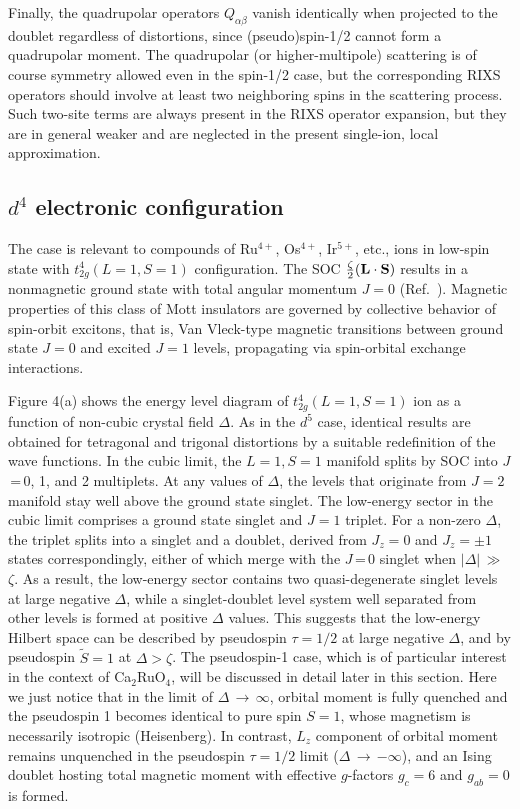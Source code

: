 \documentclass[twocolumn,prb,aps,showpacs,superscriptaddress]{revtex4-1}
\begin{document}
Finally, the quadrupolar operators $Q_{\alpha\beta}$ vanish identically when
projected to the doublet regardless of distortions, since (pseudo)spin-1/2 
cannot form a quadrupolar moment. The quadrupolar (or higher-multipole) 
scattering is of course symmetry allowed even in the spin-1/2 case, but the 
corresponding RIXS operators should involve at least two neighboring spins in
the scattering process. Such two-site terms are always present in the RIXS
operator expansion\cite{AmentPRB09}, but they are in general weaker and are 
neglected in the present single-ion, local approximation. 

\subsection {$d^4$ electronic configuration}

The case is relevant to compounds of Ru$^{4+}$, Os$^{4+}$, Ir$^{5+}$, etc., ions
in low-spin state with $t_{2g}^4(L=1, S=1)$ configuration. The SOC  
$\frac{\zeta}{2}({\bf L}\cdot{\bf S})$ results in a nonmagnetic ground state 
with total angular momentum $J=0$ (Ref.~). Magnetic properties of
this class of Mott insulators are governed by collective behavior of
spin-orbit excitons\cite{Khaliullin13}, that is, Van Vleck-type magnetic 
transitions between ground state $J=0$ and excited $J=1$ levels, propagating 
via spin-orbital exchange interactions.  

Figure 4(a) shows the energy level diagram of $t_{2g}^4(L=1, S=1)$ ion as a
function of non-cubic crystal field $\Delta$. As in the $d^5$ case, identical 
results are obtained for tetragonal and trigonal distortions by a suitable 
redefinition of the wave functions. In the cubic limit, the $L=1, S=1$ manifold 
splits by SOC into $J$\,=\,0, 1, and 2 multiplets. At any values of $\Delta$, 
the levels that originate from $J=2$ manifold stay well above the ground
state singlet. The low-energy sector in the cubic limit comprises a ground 
state singlet and $J=1$ triplet. For a non-zero $\Delta$, the triplet splits 
into a singlet and a doublet, derived from $J_z=0$ and $J_z=\pm 1$ states 
correspondingly, either of which merge with the $J$\,=\,0 singlet when 
$\lvert\Delta\lvert$\,$\gg$\,$\zeta$. As a result, the low-energy sector 
contains two quasi-degenerate singlet levels at large negative $\Delta$, while 
a singlet-doublet level system well separated from other levels is formed at 
positive $\Delta$ values. This suggests that the low-energy Hilbert space can 
be described by pseudospin $\tau=1/2$ at large negative $\Delta$, and by 
pseudospin $\tilde{S}=1$ at $\Delta>\zeta$. The pseudospin-1 case, which is 
of particular interest in the context of Ca$_2$RuO$_4$\cite{Jai17}, will be
discussed in detail later in this section. Here we just notice that in the
limit of $\Delta$\,$\rightarrow$\,$\infty$, orbital moment is fully quenched
and the pseudospin 1 becomes identical to pure spin $S=1$, whose magnetism 
is necessarily isotropic (Heisenberg). In contrast, $L_z$ component of 
orbital moment remains unquenched in the pseudospin $\tau=1/2$ limit 
($\Delta$\,$\rightarrow$\,$-\infty$), and an Ising doublet hosting total
magnetic moment with effective $g$-factors $g_c=6$ and $g_{ab}=0$ is formed.  
\end{document}

